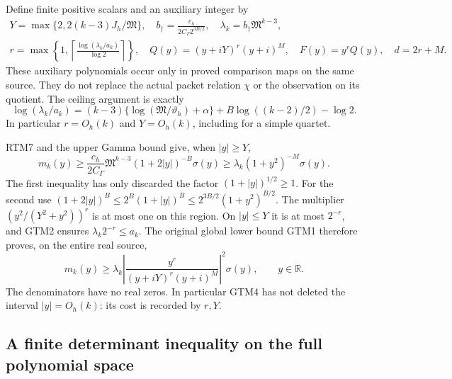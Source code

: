 Define finite positive scalars and an auxiliary integer by
\begin{equation}\tag{GTM2}
 \begin{gathered}
 Y=\max\{2,2(k-3)J_h/\mathfrak M\},\quad
 b_\dagger=\frac{c_h}{2C_\Gamma2^{3B/2}},\quad
 \lambda_k=b_\dagger\mathfrak M^{k-3},\\
 r=\max\left\{1,\left\lceil
       \frac{\log(\lambda_k/a_k)}{\log2}\right\rceil\right\},\quad
 Q(y)=(y+iY)^r(y+i)^M,\quad F(y)=y^rQ(y),\quad d=2r+M.
 \end{gathered}
\end{equation}
These auxiliary polynomials occur only in proved comparison maps on
the same source.  They do not replace the actual packet relation
$\chi$ or the observation on its quotient.  The ceiling argument is
exactly
\begin{equation}\tag{GTM3}
 \log(\lambda_k/a_k)
 =(k-3)\{\log(\mathfrak M/\vartheta_h)+\alpha\}
      +B\log((k-2)/2)-\log2.
\end{equation}
In particular $r=O_h(k)$ and $Y=O_h(k)$, including for a simple quartet.

RTM7 and the upper Gamma bound give, when $|y|\ge Y$,
\[
 m_k(y)\ge\frac{c_h}{2C_\Gamma}\mathfrak M^{k-3}
       (1+2|y|)^{-B}\sigma(y)
 \ge\lambda_k(1+y^2)^{-M}\sigma(y).
\]
The first inequality has only discarded the factor $(1+|y|)^{1/2}\ge1$.
For the second use
$(1+2|y|)^B\le2^B(1+|y|)^B
\le2^{3B/2}(1+y^2)^{B/2}$.
The multiplier $(y^2/(Y^2+y^2))^r$ is at most one on this region.
On $|y|\le Y$ it is at most $2^{-r}$, and GTM2 ensures
$\lambda_k2^{-r}\le a_k$.  The original global lower bound GTM1
therefore proves, on the entire real source,
\begin{equation}\tag{GTM4}
 \boxed{m_k(y)\ge\lambda_k
    \left|\frac{y^r}{(y+iY)^r(y+i)^M}\right|^2\sigma(y),
                      \qquad y\in\mathbb R.}
\end{equation}
The denominators have no real zeros.  In particular GTM4 has not
deleted the interval $|y|=O_h(k)$: its cost is recorded by $r,Y$.

\subsection{A finite determinant inequality on the full polynomial space}

